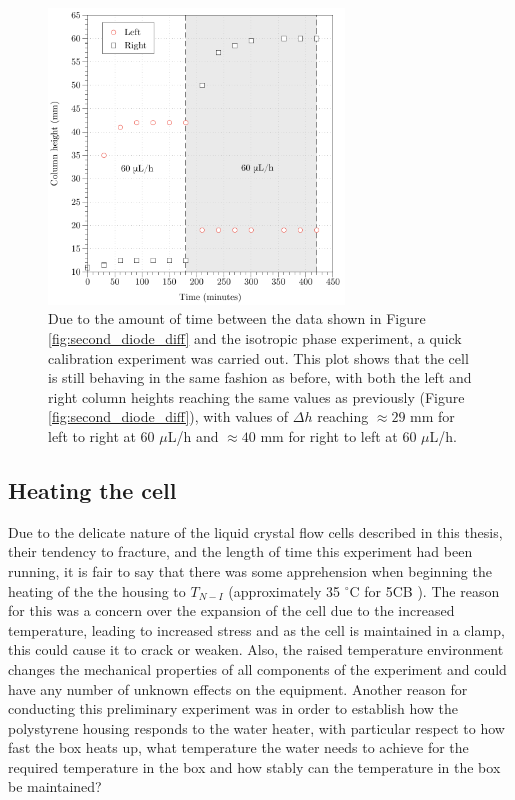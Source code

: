 \begin{figure}
\begin{center}
\includegraphics[width=0.7\textwidth]{Figures/Diode/second_diode/isotropic/check_same_as_before}
\end{center}
\caption[Second diode repeat experiment]{\label{fig:isotropic_check} Due to the amount of time between the data shown in Figure \ref{fig:second_diode_diff} and the isotropic phase experiment, a quick calibration experiment was carried out. This plot shows that the cell is still behaving in the same fashion as before, with both the left and right column heights reaching the same values as previously (Figure \ref{fig:second_diode_diff}), with values of $\Delta h$ reaching $\approx29$ mm for left to right at 60 $\mu$L/h and $\approx40$ mm for right to left at 60 $\mu$L/h.}
\end{figure}

\subsection{Heating the cell}
Due to the delicate nature of the liquid crystal flow cells described in this thesis, their tendency to fracture, and the length of time this experiment had been running, it is fair to say that there was some apprehension when beginning the heating of the the housing to $T_{N-I}$ (approximately 35 $^{\circ}\text{C}$ for 5CB \cite{Skarp1979}). The reason for this was a concern over the expansion of the cell due to the increased temperature, leading to increased stress and as the cell is maintained in a clamp, this could cause it to crack or weaken. Also, the raised temperature environment changes the mechanical properties of all components of the experiment and could have any number of unknown effects on the equipment. Another reason for conducting this preliminary experiment was in order to establish how the polystyrene housing responds to the water heater, with particular respect to how fast the box heats up, what temperature the water needs to achieve for the required temperature in the box and how stably can the temperature in the box be maintained?

